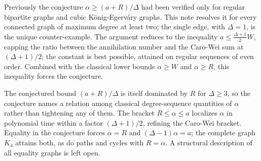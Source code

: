 \documentclass[11pt]{article}
\theoremstyle{remark}
\begin{document}
Previously the conjecture $\alpha \ge (a+R)/\Delta$ had been verified only for
regular bipartite graphs and cubic K\"onig-Egerv\'ary graphs. This note
resolves it for every connected graph of maximum degree at least two; the
single edge, with $\Delta = 1$, is the unique counter-example. The argument
reduces to the inequality $a \le \tfrac{\Delta+1}{2}W$, capping the ratio
between the annihilation number and the Caro-Wei sum at $(\Delta+1)/2$; the
constant is best possible, attained on regular sequences of even order.
Combined with the classical lower bounds $\alpha \ge W$ and $\alpha \ge R$,
this inequality forces the conjecture.

The conjectured bound $(a+R)/\Delta$ is itself dominated by $R$ for
$\Delta \ge 3$, so the conjecture names a relation among classical
degree-sequence quantities of $\alpha$ rather than tightening any of them.
The bracket $R \le \alpha \le a$ localizes $\alpha$ in polynomial
time within a factor $(\Delta+1)/2$, refining the Caro-Wei bracket. Equality
in the conjecture forces $\alpha = R$ and $(\Delta-1)\alpha = a$; the
complete graph $K_4$ attains both, as do paths and cycles with $R = \alpha$.
A structural description of all equality graphs is left open.



\end{document}
